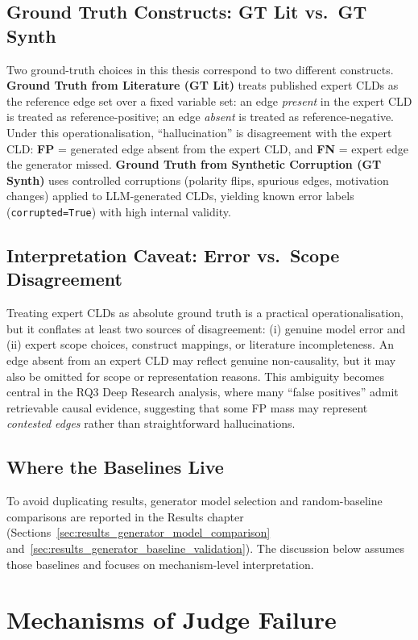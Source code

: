 \subsection{Ground Truth Constructs: GT Lit vs.\ GT Synth}
Two ground-truth choices in this thesis correspond to two different constructs.
\textbf{Ground Truth from Literature (GT Lit)} treats published expert CLDs as the reference edge set over a fixed variable set: an edge \textit{present} in the expert CLD is treated as reference-positive; an edge \textit{absent} is treated as reference-negative. Under this operationalisation, ``hallucination'' is disagreement with the expert CLD: \textbf{FP} = generated edge absent from the expert CLD, and \textbf{FN} = expert edge the generator missed.
\textbf{Ground Truth from Synthetic Corruption (GT Synth)} uses controlled corruptions (polarity flips, spurious edges, motivation changes) applied to LLM-generated CLDs, yielding known error labels (\texttt{corrupted=True}) with high internal validity.

\subsection{Interpretation Caveat: Error vs.\ Scope Disagreement}
Treating expert CLDs as absolute ground truth is a practical operationalisation, but it conflates at least two sources of disagreement: (i) genuine model error and (ii) expert scope choices, construct mappings, or literature incompleteness. An edge absent from an expert CLD may reflect genuine non-causality, but it may also be omitted for scope or representation reasons. This ambiguity becomes central in the RQ3 Deep Research analysis, where many ``false positives'' admit retrievable causal evidence, suggesting that some FP mass may represent \emph{contested edges} rather than straightforward hallucinations.

\subsection{Where the Baselines Live}
To avoid duplicating results, generator model selection and random-baseline comparisons are reported in the Results chapter (Sections~\ref{sec:results_generator_model_comparison} and~\ref{sec:results_generator_baseline_validation}). The discussion below assumes those baselines and focuses on mechanism-level interpretation.

\section{Mechanisms of Judge Failure}
\label{sec:discussion_failure_mechanisms}

